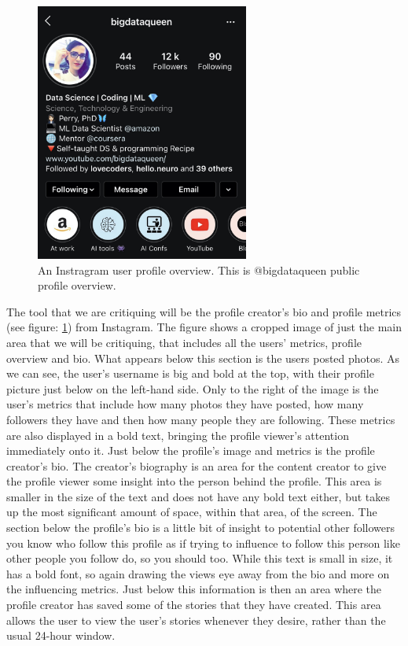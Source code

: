 \documentclass{sigchi}
\begin{document}
\begin{figure}
	\begin{center}
		\includegraphics[width=7cm]{instagram_example2.jpeg}
		\caption{An Instragram user profile overview. This is @bigdataqueen public profile overview.}
		\label{fig:instagram_overview}
	\end{center}
\end{figure}

	The tool that we are critiquing will be the profile creator's bio and profile metrics (see figure: \ref{fig:instagram_overview}) from Instagram. The figure shows a cropped image of just the main area that we will be critiquing, that includes all the users' metrics, profile overview and bio. What appears below this section is the users posted photos. As we can see, the user's username is big and bold at the top, with their profile picture just below on the left-hand side. Only to the right of the image is the user's metrics that include how many photos they have posted, how many followers they have and then how many people they are following. These metrics are also displayed in a bold text, bringing the profile viewer's attention immediately onto it. Just below the profile's image and metrics is the profile creator's bio. The creator's biography is an area for the content creator to give the profile viewer some insight into the person behind the profile. This area is smaller in the size of the text and does not have any bold text either, but takes up the most significant amount of space, within that area, of the screen. The section below the profile's bio is a little bit of insight to potential other followers you know who follow this profile as if trying to influence to follow this person like other people you follow do, so you should too. While this text is small in size, it has a bold font, so again drawing the views eye away from the bio and more on the influencing metrics. Just below this information is then an area where the profile creator has saved some of the stories that they have created. This area allows the user to view the user's stories whenever they desire, rather than the usual 24-hour window.
	
\end{document}
